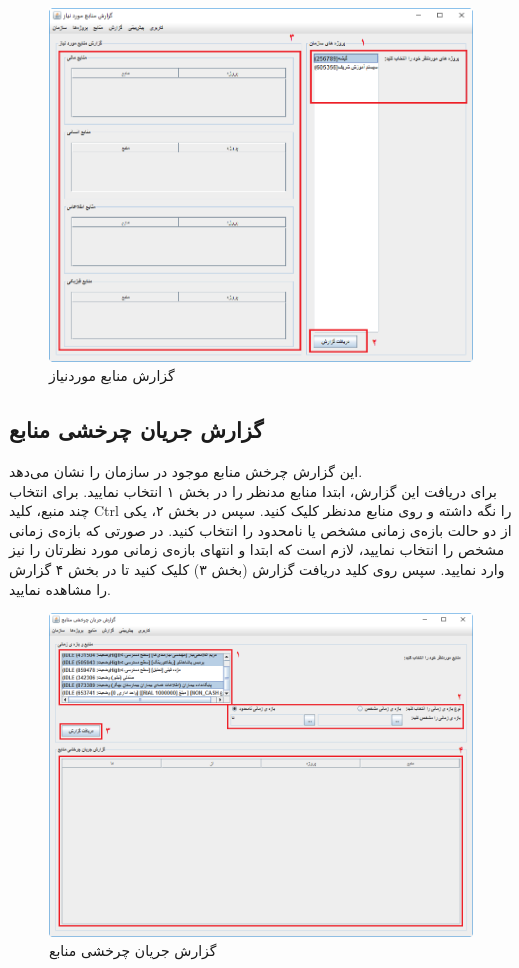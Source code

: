 	\begin{figure}[H]
		\centering
		\includegraphics[scale=0.5]{img/manual/reqRep}
		\caption{گزارش منابع موردنیاز}
	\end{figure}
	


\subsection{گزارش جریان چرخشی منابع }
این گزارش چرخش منابع موجود در سازمان را نشان می‌دهد.\\
برای دریافت این گزارش، ابتدا  منابع مدنظر را در بخش ۱ انتخاب نمایید. برای انتخاب چند منبع، کلید Ctrl را نگه داشته و روی منابع مدنظر کلیک کنید. سپس در بخش ۲، یکی از دو حالت بازه‌ی زمانی مشخص یا نامحدود را انتخاب کنید. در صورتی که بازه‌ی زمانی مشخص را انتخاب نمایید، لازم است که ابتدا و انتهای بازه‌ی زمانی مورد نظرتان را نیز وارد نمایید. سپس روی کلید دریافت گزارش (بخش ۳) کلیک کنید تا در بخش ۴ گزارش را مشاهده نمایید.

	\begin{figure}[H]
		\centering
		\includegraphics[scale=0.5]{img/manual/flowRep}
		\caption{گزارش جریان چرخشی منابع}
	\end{figure}
	


